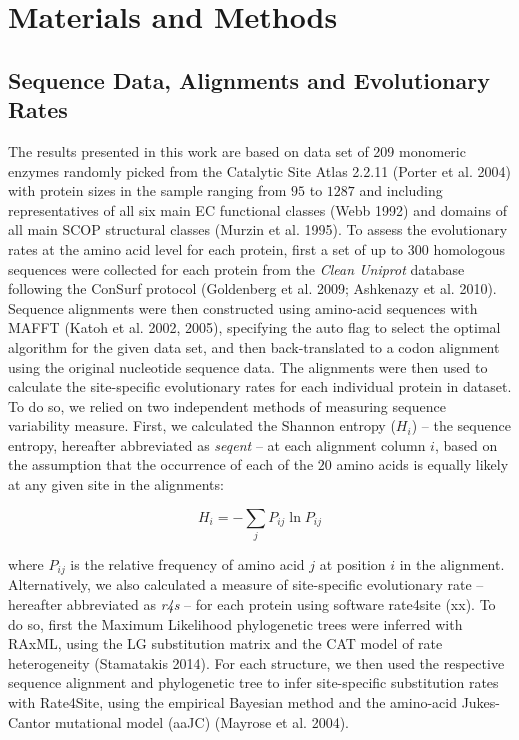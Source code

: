 \documentclass[11pt]{article}
\begin{document}
\section{Materials and Methods}
\label{sec:mam}

    \subsection*{Sequence Data, Alignments and Evolutionary Rates}

    The results presented in this work are based on data set of 209 monomeric enzymes randomly picked from the Catalytic Site Atlas 2.2.11 (Porter et al. 2004) with protein sizes in the sample ranging from $95$ to $1287$ and including representatives of all six main EC functional classes (Webb 1992) and domains of all main SCOP structural classes (Murzin et al. 1995). To assess the evolutionary rates at the amino acid level for each protein, first a set of up to $300$ homologous sequences were collected for each protein from the {\it Clean Uniprot} database following the ConSurf protocol (Goldenberg et al. 2009; Ashkenazy et al. 2010). Sequence alignments were then constructed using amino-acid sequences with MAFFT (Katoh et al. 2002, 2005), specifying the auto flag to select the optimal algorithm for the given data set, and then back-translated to a codon alignment using the original nucleotide sequence data. The alignments were then used to calculate the site-specific evolutionary rates for each individual protein in dataset. To do so, we relied on two independent methods of measuring sequence variability measure. First, we calculated the Shannon entropy ($H_i$) -- the sequence entropy, hereafter abbreviated as {\it seqent} -- at each alignment column $i$, based on the assumption that the occurrence of each of the $20$ amino acids is equally likely at any given site in the alignments:

    \begin{equation}
        \label{eqn:shannon}
        H_i = -\sum_j P_{ij}\ln P_{ij}
    \end{equation}

    where $P_{ij}$ is the relative frequency of amino acid $j$ at position $i$ in the alignment. Alternatively, we also calculated a measure of site-specific evolutionary rate -- hereafter abbreviated as {\it r4s} -- for each protein using software rate4site (xx). To do so, first the Maximum Likelihood phylogenetic trees were inferred with RAxML, using the LG substitution matrix and the CAT model of rate heterogeneity (Stamatakis 2014). For each structure, we then used the respective sequence alignment and phylogenetic tree to infer site-specific substitution rates with Rate4Site, using the empirical Bayesian method and the amino-acid Jukes-Cantor mutational model (aaJC) (Mayrose et al. 2004).
\end{document}
